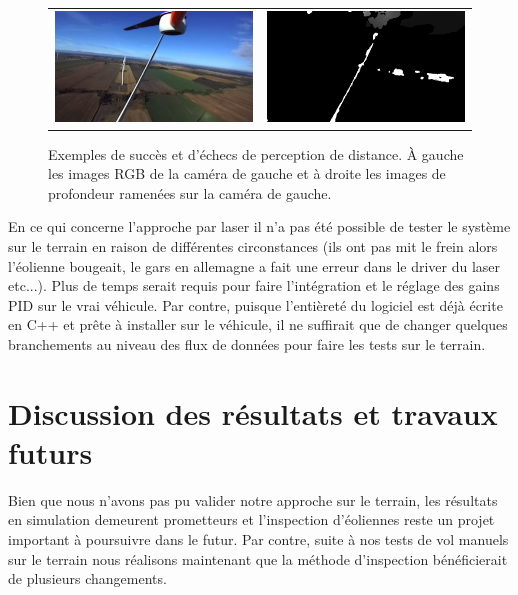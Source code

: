 \begin{figure}
\begin{tabular}{cc}
    \includegraphics[width=0.5\linewidth]{images/field_stereo_success_rgb2.png} &
    \includegraphics[width=0.5\linewidth]{images/field_stereo_success_pcl2.png} \\
  \end{tabular}
  \caption{Exemples de succès et d'échecs de perception de distance. À gauche les images RGB de la caméra de gauche et à droite les images de profondeur ramenées sur la caméra de gauche.}
  \label{fig:field_stereo_fail}
\end{figure}

\color{red}
En ce qui concerne l'approche par laser il n'a pas été possible de tester le système sur le terrain en raison de différentes circonstances (ils ont pas mit le frein alors l'éolienne bougeait, le gars en allemagne a fait une erreur dans le driver du laser etc...). Plus de temps serait requis pour faire l'intégration et le réglage des gains PID sur le vrai véhicule. Par contre, puisque l'entièreté du logiciel est déjà écrite en C++ et prête à installer sur le véhicule, il ne suffirait que de changer quelques branchements au niveau des flux de données pour faire les tests sur le terrain.
\color{black}

\clearpage
\section{Discussion des résultats et travaux futurs}

Bien que nous n'avons pas pu valider notre approche sur le terrain, les résultats en simulation demeurent prometteurs et l'inspection d'éoliennes reste un projet important à poursuivre dans le futur. Par contre, suite à nos tests de vol manuels sur le terrain nous réalisons maintenant que la méthode d'inspection bénéficierait de plusieurs changements.

